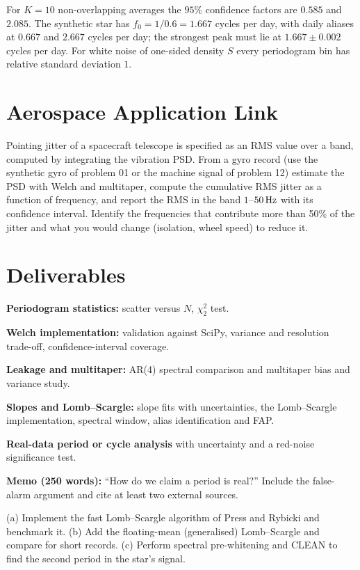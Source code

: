 \documentclass[11pt,a4paper]{article}
\begin{document}
\begin{checkpoint}
For $K=10$ non-overlapping averages the $95\%$ confidence factors are $0.585$ and $2.085$. The synthetic star has $f_0=1/0.6=1.667$ cycles per day, with daily aliases at $0.667$ and $2.667$ cycles per day; the strongest peak must lie at $1.667\pm0.002$ cycles per day. For white noise of one-sided density $S$ every periodogram bin has relative standard deviation $1$.
\end{checkpoint}

\section*{Aerospace Application Link}
Pointing jitter of a spacecraft telescope is specified as an RMS value over a band, computed by integrating the vibration PSD. From a gyro record (use the synthetic gyro of problem 01 or the machine signal of problem 12) estimate the PSD with Welch and multitaper, compute the cumulative RMS jitter as a function of frequency, and report the RMS in the band $1$--$\SI{50}{\hertz}$ with its confidence interval. Identify the frequencies that contribute more than 50\% of the jitter and what you would change (isolation, wheel speed) to reduce it.

\section*{Deliverables}
\begin{delivs}
  \item[D1] \textbf{Periodogram statistics:} scatter versus $N$, $\chi^2_2$ test.
  \item[D2] \textbf{Welch implementation:} validation against SciPy, variance and resolution trade-off, confidence-interval coverage.
  \item[D3] \textbf{Leakage and multitaper:} AR(4) spectral comparison and multitaper bias and variance study.
  \item[D4] \textbf{Slopes and Lomb--Scargle:} slope fits with uncertainties, the Lomb--Scargle implementation, spectral window, alias identification and FAP.
  \item[D5] \textbf{Real-data period or cycle analysis} with uncertainty and a red-noise significance test.
  \item[D6] \textbf{Memo (250 words):} ``How do we claim a period is real?'' Include the false-alarm argument and cite at least two external sources.
  \item[Bonus] (a) Implement the fast Lomb--Scargle algorithm of Press and Rybicki and benchmark it. (b) Add the floating-mean (generalised) Lomb--Scargle and compare for short records. (c) Perform spectral pre-whitening and CLEAN to find the second period in the star's signal.
\end{delivs}
\end{document}
